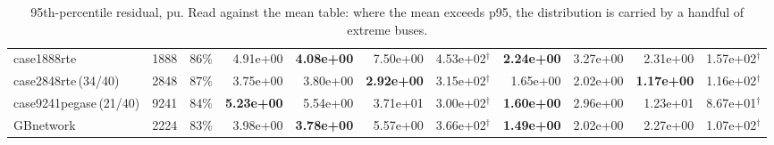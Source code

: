 \documentclass[10pt]{article}
\begin{document}
\begin{landscape}
\begin{table}[H]
\begin{tabular}{lrr rrrr rrrr}
case1888rte & 1888 & 86\% & 4.91e+00 & \textbf{4.08e+00} & 7.50e+00 & 4.53e+02$^\dagger$ & \textbf{2.24e+00} & 3.27e+00 & 2.31e+00 & 1.57e+02$^\dagger$ \\
case2848rte\,(34/40) & 2848 & 87\% & 3.75e+00 & 3.80e+00 & \textbf{2.92e+00} & 3.15e+02$^\dagger$ & 1.65e+00 & 2.02e+00 & \textbf{1.17e+00} & 1.16e+02$^\dagger$ \\
case9241pegase\,(21/40) & 9241 & 84\% & \textbf{5.23e+00} & 5.54e+00 & 3.71e+01 & 3.00e+02$^\dagger$ & \textbf{1.60e+00} & 2.96e+00 & 1.23e+01 & 8.67e+01$^\dagger$ \\
GBnetwork & 2224 & 83\% & 3.98e+00 & \textbf{3.78e+00} & 5.57e+00 & 3.66e+02$^\dagger$ & \textbf{1.49e+00} & 2.02e+00 & 2.27e+00 & 1.07e+02$^\dagger$ \\
\bottomrule
\end{tabular}
\caption{95th-percentile residual, pu. Read against the mean table: where the mean exceeds p95, the distribution is carried by a handful of extreme buses.}
\end{table}
\end{landscape}
\end{document}
